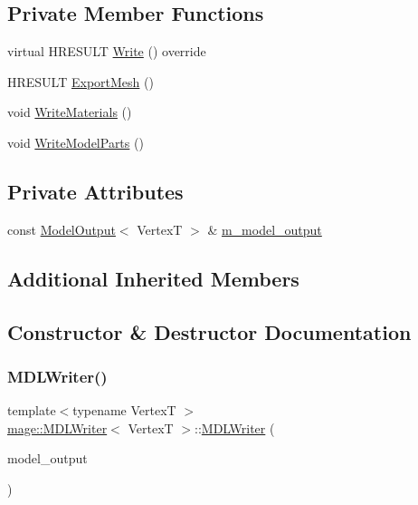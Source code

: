 \subsection*{Private Member Functions}
\begin{DoxyCompactItemize}
\item 
virtual H\+R\+E\+S\+U\+LT \hyperlink{classmage_1_1_m_d_l_writer_abd4f206b457d8b97e6e38e25f7e88ed3}{Write} () override
\item 
H\+R\+E\+S\+U\+LT \hyperlink{classmage_1_1_m_d_l_writer_ae749244a6528ab81600a62e95e73a44a}{Export\+Mesh} ()
\item 
void \hyperlink{classmage_1_1_m_d_l_writer_af9416c1b2599ea86f4af8018dc0b9baf}{Write\+Materials} ()
\item 
void \hyperlink{classmage_1_1_m_d_l_writer_a3db84a4600cb777b37c666166a631689}{Write\+Model\+Parts} ()
\end{DoxyCompactItemize}
\subsection*{Private Attributes}
\begin{DoxyCompactItemize}
\item 
const \hyperlink{structmage_1_1_model_output}{Model\+Output}$<$ VertexT $>$ \& \hyperlink{classmage_1_1_m_d_l_writer_a607fc83a3dbab79f55c3eaca203c027b}{m\+\_\+model\+\_\+output}
\end{DoxyCompactItemize}
\subsection*{Additional Inherited Members}


\subsection{Constructor \& Destructor Documentation}
\hypertarget{classmage_1_1_m_d_l_writer_a7e5c6c9c9a9d32b09c5e17f4691e01c1}{}\label{classmage_1_1_m_d_l_writer_a7e5c6c9c9a9d32b09c5e17f4691e01c1} 
\subsubsection{\texorpdfstring{M\+D\+L\+Writer()}{MDLWriter()}\hspace{0.1cm}{\footnotesize\ttfamily [1/3]}}
{\footnotesize\ttfamily template$<$typename VertexT $>$ \\
\hyperlink{classmage_1_1_m_d_l_writer}{mage\+::\+M\+D\+L\+Writer}$<$ VertexT $>$\+::\hyperlink{classmage_1_1_m_d_l_writer}{M\+D\+L\+Writer} (\begin{DoxyParamCaption}\item[{const \hyperlink{structmage_1_1_model_output}{Model\+Output}$<$ VertexT $>$ \&}]{model\+\_\+output }\end{DoxyParamCaption})\hspace{0.3cm}{\ttfamily [explicit]}}

